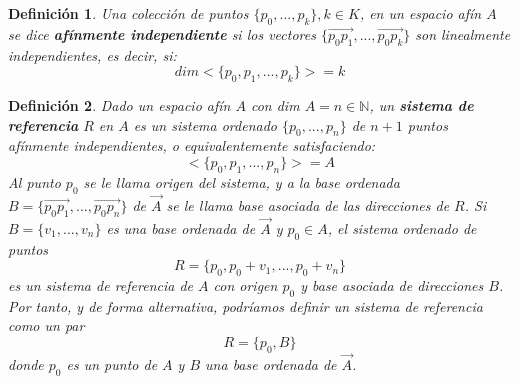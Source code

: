 \documentclass[a4paper,11pt, oneside]{book}
\newtheorem{defi}{Definición}
\begin{document}
\begin{defi}
	Una colección de puntos $\{p_0,...,p_k\}, k \in K$, en un espacio afín $A$ se dice \textbf{afínmente independiente} si los vectores $\{\overrightarrow{p_0p_1},...,\overrightarrow{p_0p_k}\}$ son linealmente independientes, es decir, si:
	\begin{equation}
	dim<\{p_0,p_1,...,p_k\}> = k
	\end{equation}
\end{defi}
\begin{defi}
	Dado un espacio afín $A$ con dim $A = n \in \mathbb N$, un \textbf{sistema de referencia} $R$ en $A$ es un sistema ordenado $\{p_0, ..., p_n\}$ de $n+1$ puntos afínmente independientes, o equivalentemente satisfaciendo:
	\begin{equation}
	<\{p_0,p_1,...,p_n\}> = A
	\end{equation}
	Al punto $p_0$ se le llama origen del sistema, y a la base ordenada \\$B = \{\overrightarrow{p_0p_1}, ..., \overrightarrow{p_0p_n}\}$ de $\overrightarrow{A}$ se le llama base asociada de las direcciones de $R$.
	Si $B = \{v_1,...,v_n\}$ es una base ordenada de $\overrightarrow{A}$ y $p_0 \in A$, el sistema ordenado de puntos
	\begin{equation}
	R = \{p_0, p_0+v_1, ..., p_0+v_n\}
	\end{equation}
	es un sistema de referencia de $A$ con origen $p_0$ y base asociada de direcciones $B$. Por tanto, y de forma alternativa, podríamos definir un sistema de referencia como un par
	\begin{equation}
	R = \{p_0, B\}
	\end{equation}
	donde $p_0$ es un punto de $A$ y $B$ una base ordenada de $\overrightarrow{A}$.
\end{defi}
\end{document}
